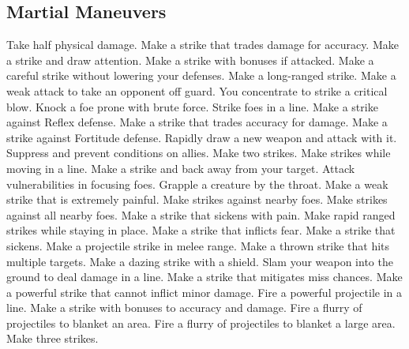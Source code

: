 \small
\subsection{Martial Maneuvers}\label{Martial Maneuvers}
\begin{spelllist}
 Take half physical damage.
 Make a strike that trades damage for accuracy.
 Make a strike and draw attention.
 Make a strike with bonuses if attacked.
 Make a careful strike without lowering your defenses.
 Make a long-ranged strike.
 Make a weak attack to take an opponent off guard.
 You concentrate to strike a critical blow.
 Knock a foe prone with brute force.
 Strike foes in a line.
 Make a strike against Reflex defense.
 Make a strike that trades accuracy for damage.
 Make a strike against Fortitude defense.
 Rapidly draw a new weapon and attack with it.
 Suppress and prevent conditions on allies.
 Make two strikes.
 Make strikes while moving in a line.
 Make a strike and back away from your target.
 Attack vulnerabilities in focusing foes.
 Grapple a creature by the throat.
 Make a weak strike that is extremely painful.
 Make strikes against nearby foes.
 Make strikes against all nearby foes.
 Make a strike that sickens with pain.
 Make rapid ranged strikes while staying in place.
 Make a strike that inflicts fear.
 Make a strike that sickens.
 Make a projectile strike in melee range.
 Make a thrown strike that hits multiple targets.
 Make a dazing strike with a shield.
 Slam your weapon into the ground to deal damage in a line.
 Make a strike that mitigates miss chances.
 Make a powerful strike that cannot inflict minor damage.
 Fire a powerful projectile in a line.
 Make a strike with bonuses to accuracy and damage.
 Fire a flurry of projectiles to blanket an area.
 Fire a flurry of projectiles to blanket a large area.
 Make three strikes.
\end{spelllist}



